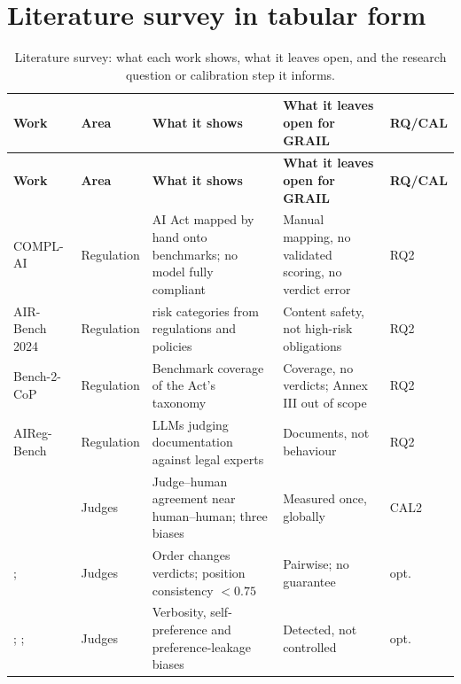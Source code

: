 \section*{Literature survey in tabular form}
\par\vspace{0.5em}
{\scriptsize
\setlength{\tabcolsep}{3pt}\setlength{\LTpre}{1.5em}\setlength{\LTpost}{1em}
\renewcommand{\arraystretch}{1.15}
\begin{longtable}{@{}>{\raggedright\arraybackslash}p{2.6cm}>{\raggedright\arraybackslash}p{1.8cm}>{\raggedright\arraybackslash}p{4.3cm}>{\raggedright\arraybackslash}p{4.3cm}>{\raggedright\arraybackslash}p{1.3cm}@{}}
\caption{Literature survey: what each work shows, what it leaves open, and the research question or calibration step it informs.}\label{tab:litsurvey}\\
\toprule
\textbf{Work} & \textbf{Area} & \textbf{What it shows} & \textbf{What it leaves open for GRAIL} & \textbf{RQ/CAL} \\
\midrule
\endfirsthead
\toprule
\textbf{Work} & \textbf{Area} & \textbf{What it shows} & \textbf{What it leaves open for GRAIL} & \textbf{RQ/CAL} \\
\midrule
\endhead
\bottomrule
\endfoot
COMPL-AI \citep{complai} & Regulation & AI Act mapped by hand onto benchmarks; no model fully compliant & Manual mapping, no validated scoring, no verdict error & RQ2 \\
AIR-Bench 2024 \citep{airbench} & Regulation & 314 risk categories from regulations and policies & Content safety, not high-risk obligations & RQ2 \\
Bench-2-CoP \citep{bench2cop} & Regulation & Benchmark coverage of the Act's taxonomy & Coverage, no verdicts; Annex III out of scope & RQ2 \\
AIReg-Bench \citep{airegbench} & Regulation & LLMs judging documentation against legal experts & Documents, not behaviour & RQ2 \\
\citet{zheng} & Judges & Judge--human agreement near human--human; three biases & Measured once, globally & CAL2 \\
\citet{wang2023fair}; \citet{shi2024position} & Judges & Order changes verdicts; position consistency $<0.75$ & Pairwise; no guarantee & opt. \\
\citet{saito2023}; \citet{wataoka2024}; \citet{li2025leakage} & Judges & Verbosity, self-preference and preference-leakage biases & Detected, not controlled & opt. \\

\end{longtable}}
